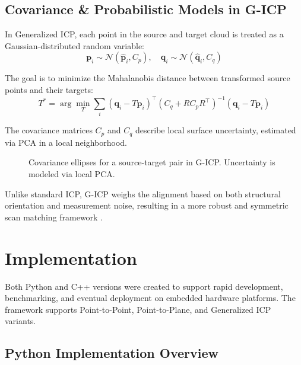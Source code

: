 \documentclass[11pt]{article}
\begin{document}
\subsection{Covariance \& Probabilistic Models in G-ICP}

In Generalized ICP, each point in the source and target cloud is treated as a Gaussian-distributed random variable:
\[
\mathbf{p}_i \sim \mathcal{N}(\hat{\mathbf{p}}_i, C_p), \quad \mathbf{q}_i \sim \mathcal{N}(\hat{\mathbf{q}}_i, C_q)
\]

The goal is to minimize the Mahalanobis distance between transformed source points and their targets:
\[
T^* = \arg\min_T \sum_i (\mathbf{q}_i - T\mathbf{p}_i)^\top (C_q + R C_p R^\top)^{-1} (\mathbf{q}_i - T\mathbf{p}_i)
\]

The covariance matrices $C_p$ and $C_q$ describe local surface uncertainty, estimated via PCA in a local neighborhood.

\begin{figure}[h]
\centering
{}
\caption{Covariance ellipses for a source-target pair in G-ICP. Uncertainty is modeled via local PCA.}
\end{figure}

Unlike standard ICP, G-ICP weighs the alignment based on both structural orientation and measurement noise, resulting in a more robust and symmetric scan matching framework \citep{segal2009gicp}.

\section{Implementation}

Both Python and C++ versions were created to support rapid development, benchmarking, and eventual deployment on embedded hardware platforms. The framework supports Point-to-Point, Point-to-Plane, and Generalized ICP variants.

\subsection{Python Implementation Overview}
\end{document}
